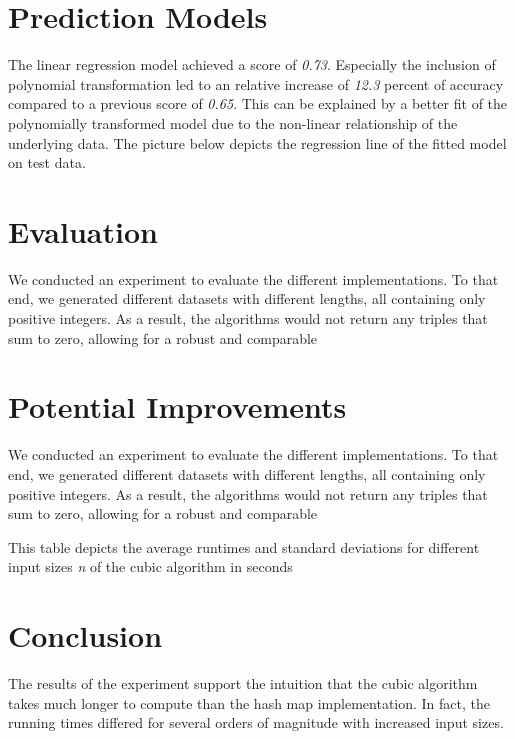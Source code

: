 \documentclass[12pt, a4paper]{article}
\begin{document}
\section{Prediction Models}

The linear regression model achieved a score of \emph{0.73}. Especially the inclusion of polynomial transformation led to an relative increase of \emph{12.3} percent of accuracy compared to a previous score of \emph{0.65}. This can be explained by a better fit of the polynomially transformed model due to the non-linear relationship of the underlying data. The picture below depicts the regression line of the fitted model on test data.




\section{Evaluation}

We conducted an experiment to evaluate the different implementations. To that end, we generated different datasets with different lengths, all containing only positive integers. As a result, the algorithms would not return any triples that sum to zero, allowing for a robust and comparable

\section{Potential Improvements}

We conducted an experiment to evaluate the different implementations. To that end, we generated different datasets with different lengths, all containing only positive integers. As a result, the algorithms would not return any triples that sum to zero, allowing for a robust and comparable


\begin{table}[h]
  \begin{center}
  \caption{This table depicts the average runtimes and standard deviations for different input sizes \emph{n} of the cubic algorithm in seconds}
  \label{tbl:resultscubic}
  \end{center}
\end{table}

\clearpage

\section{Conclusion}
The results of the experiment support the intuition that the cubic algorithm takes much longer to compute than the hash map implementation. In fact, the running times differed for several orders of magnitude with increased input sizes.
\end{document}
